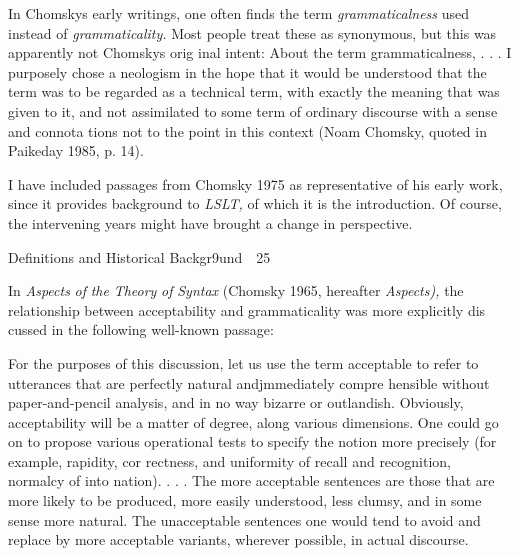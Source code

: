\begin{listWWNumlxivleveli}
\item 
\begin{styleStandard}
In Chomsky{\textquotesingle}s early writings, one often finds the term \textit{grammaticalness}\textit{ }used instead of \textit{grammaticality.}\textit{ }Most people treat these as synonymous, but this was apparently not Chomsky{\textquotesingle}s orig\- inal intent: {\textquotedbl}About the term {\textquotesingle}grammaticalness,{\textquotesingle} . . . I purposely chose a neologism in the hope that it would be understood that the term was to be regarded as a technical term, with exactly the meaning that was given to it, and not assimilated to some term of ordinary discourse with a sense and connota\- tions not to the point in this context{\textquotedbl} (Noam Chomsky, quoted in Paikeday 1985, p. 14).
\end{styleStandard}


\item 
\begin{styleStandard}
I have included passages from Chomsky 1975 as representative of his early work, since it provides background to \textit{LSLT,}\textit{ }of which it is the introduction. Of course, the intervening years might have brought a change in perspective.
\end{styleStandard}


\end{listWWNumlxivleveli}
\clearpage\setcounter{page}{1}\begin{styleStandard}
Definitions and Historical Backgr9und\ \ 25
\end{styleStandard}


\begin{styleStandard}
In \textit{Aspects}\textit{ }\textit{of}\textit{ }\textit{the}\textit{ }\textit{Theory}\textit{ }\textit{of}\textit{ }\textit{Syntax}\textit{ }(Chomsky 1965, hereafter \textit{Aspects),}\textit{ }the relationship between acceptability and grammaticality was more explicitly dis\- cussed in the following well-known passage:
\end{styleStandard}


\begin{styleStandard}
For the purposes of this discussion, let us use the term {\textquotedbl}acceptable{\textquotedbl} to refer to utterances that are perfectly natural andjmmediately compre\- hensible without paper-and-pencil analysis, and in no way bizarre or outlandish. Obviously, acceptability will be a matter of degree, along various dimensions. One could go on to propose various operational tests to specify the notion more precisely (for example, rapidity, cor\- rectness, and uniformity of recall and recognition, normalcy of into\- nation). . . . The more acceptable sentences are those that are more likely to be produced, more easily understood, less clumsy, and in some sense more natural. The unacceptable sentences one would tend to avoid and replace by more acceptable variants, {\textquotesingle}wherever possible, in actual discourse.
\end{styleStandard}


